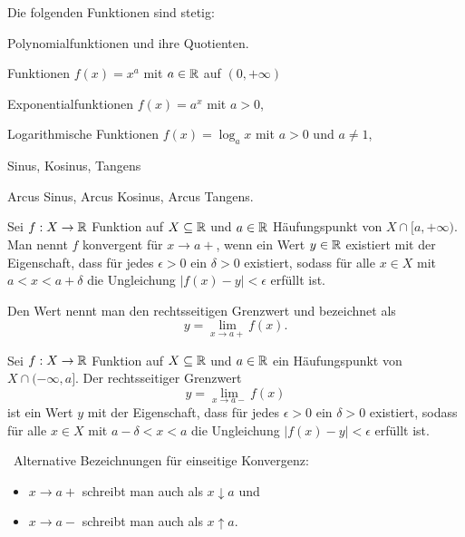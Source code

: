 \begin{thm} Die folgenden Funktionen sind stetig: 
	\begin{enuma}
		\item Polynomialfunktionen und ihre Quotienten. 
		\item Funktionen $f(x) = x^a$ mit $a \in \mathbb{R}$ auf $(0,+\infty)$
		\item Exponentialfunktionen $f(x) = a^x$ mit $a > 0$,  
		\item Logarithmische Funktionen $f(x) = \log_a x$ mit $a > 0$ und $a \ne 1$, 
		\item Sinus, Kosinus, Tangens
		\item Arcus Sinus, Arcus Kosinus, Arcus Tangens.
	\end{enuma} 
\end{thm} 

\begin{defn} 
	Sei $f : X \to \mathbb{R}$ Funktion auf $X \subseteq \mathbb{R}$ und $a \in \mathbb{R}$ Häufungspunkt von $X \cap [a,+\infty)$. Man  nennt $f$ konvergent für $x \to a+$, wenn ein Wert $y \in \mathbb{R}$ existiert mit der Eigenschaft, dass für jedes $\epsilon>0$ ein $\delta>0$ existiert, sodass für alle $x \in X$ mit $a < x < a + \delta$ die Ungleichung $|f(x) - y| < \epsilon$ erfüllt ist. 
	
	
	Den Wert nennt man den rechtsseitigen Grenzwert und bezeichnet als
	\[
	y = \lim_{x \to a+} f(x).
	\]
\end{defn}


\begin{defn} 
	Sei $f : X \to \mathbb{R}$ Funktion auf $X \subseteq \mathbb{R}$ und $a \in \mathbb{R}$ ein Häufungspunkt von $X \cap (-\infty,a]$. 
	Der rechtsseitiger Grenzwert
	\[
	y = \lim_{x \to a-} f(x)
	\]
	ist ein Wert $y$ mit der Eigenschaft, dass für jedes $\epsilon>0$ ein $\delta>0$ existiert, sodass für alle $x \in X$ mit $a - \delta < x < a$ die Ungleichung $|f(x) - y| < \epsilon$ erfüllt ist. 
\end{defn}

\begin{bem}\ 
	Alternative Bezeichnungen für einseitige Konvergenz: 
		\begin{itemize} 
			\item[] $x \to a+$  schreibt man auch als $x \downarrow a$ und
			\item[] $x \to a-$ schreibt man auch als $x \uparrow a$.
		\end{itemize} 
\end{bem}  


